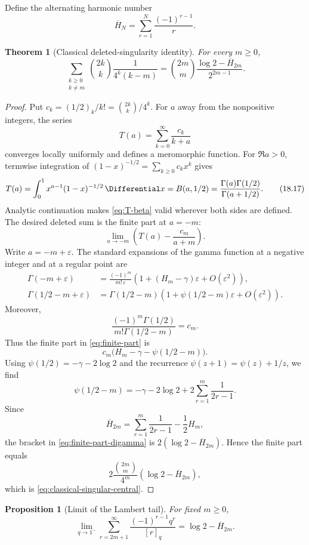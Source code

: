 \documentclass[11pt,a4paper,oneside,openany]{book}
\newtheorem{theorem}{Theorem}[chapter]
\newtheorem{proposition}[proposition]{Proposition}
\theoremstyle{definition}
\theoremstyle{remark}
\newcommand{\eps}{\varepsilon}
\begin{document}
Define the alternating harmonic number
\[
 \overline H_N=\sum_{r=1}^{N}\frac{(-1)^{r-1}}r.
\]

\begin{theorem}[Classical deleted-singularity identity]\label{thm:classical-singular-central}
For every $m\ge0$,
\[
 \sum_{\substack{k\ge0\\k\ne m}}
 \binom{2k}{k}\frac1{4^k(k-m)}
 =\binom{2m}{m}
 \frac{\log2-\overline H_{2m}}{2^{2m-1}}.
 \tag{18.16}\label{eq:classical-singular-central}
\]
\end{theorem}

\begin{proof}
Put $c_k=(1/2)_k/k!=\binom{2k}{k}/4^k$.  For $a$ away from the nonpositive integers, the series
\[
 T(a)=\sum_{k=0}^{\infty}\frac{c_k}{k+a}
\]
converges locally uniformly and defines a meromorphic function.  For $\Re a>0$, termwise integration of
$(1-x)^{-1/2}=\sum_{k\ge0}c_kx^k$ gives
\[
 T(a)=\int_0^1x^{a-1}(1-x)^{-1/2}\,\Differential x
 =B(a,1/2)
 =\frac{\Gamma(a)\Gamma(1/2)}{\Gamma(a+1/2)}.
 \tag{18.17}\label{eq:T-beta}
\]
Analytic continuation makes \eqref{eq:T-beta} valid wherever both sides are defined.  The desired deleted sum is the finite part at $a=-m$:
\[
 \lim_{a\to-m}\left(T(a)-\frac{c_m}{a+m}\right).
 \tag{18.18}\label{eq:finite-part}
\]
Write $a=-m+\eps$.  The standard expansions of the gamma function at a negative integer and at a regular point are
\begin{align*}
 \Gamma(-m+\eps)
 &=\frac{(-1)^m}{m!\,\eps}
   \left(1+(H_m-\gamma)\eps+O(\eps^2)\right),\\
 \Gamma(1/2-m+\eps)
 &=\Gamma(1/2-m)
   \left(1+\psi(1/2-m)\eps+O(\eps^2)\right).
\end{align*}
Moreover,
\[
 \frac{(-1)^m\Gamma(1/2)}{m!\Gamma(1/2-m)}=c_m.
\]
Thus the finite part in \eqref{eq:finite-part} is
\[
 c_m\bigl(H_m-\gamma-\psi(1/2-m)\bigr).
 \tag{18.19}\label{eq:finite-part-digamma}
\]
Using $\psi(1/2)=-\gamma-2\log2$ and the recurrence
$\psi(z+1)=\psi(z)+1/z$, we find
\[
 \psi(1/2-m)
 =-\gamma-2\log2+2\sum_{r=1}^{m}\frac1{2r-1}.
\]
Since
\[
 \overline H_{2m}
 =\sum_{r=1}^{m}\frac1{2r-1}-\frac12H_m,
\]
the bracket in \eqref{eq:finite-part-digamma} is
$2(\log2-\overline H_{2m})$.  Hence the finite part equals
\[
 2\frac{\binom{2m}{m}}{4^m}
 (\log2-\overline H_{2m}),
\]
which is \eqref{eq:classical-singular-central}.
\end{proof}

\begin{proposition}[Limit of the Lambert tail]\label{prop:lambert-tail-limit}
For fixed $m\ge0$,
\[
 \lim_{q\to1^-}
 \sum_{r=2m+1}^{\infty}\frac{(-1)^{r-1}q^r}{[r]_q}
 =\log2-\overline H_{2m}.
 \tag{18.20}\label{eq:lambert-tail-limit}
\]
\end{proposition}
\end{document}

